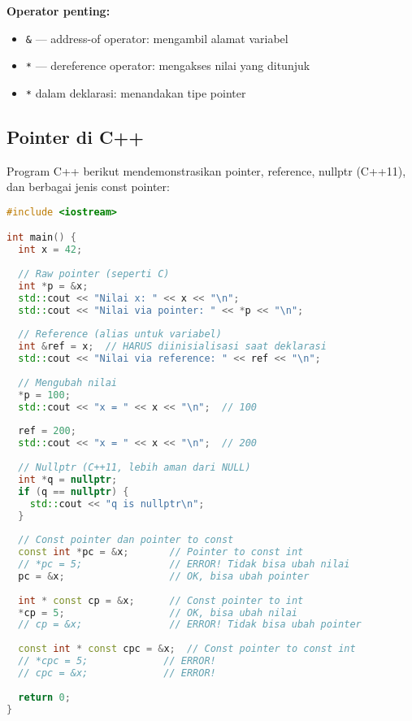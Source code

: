 \documentclass[../main.tex]{subfiles}
\begin{document}
\textbf{Operator penting:}
\begin{itemize}
  \item \texttt{\&} --- address-of operator: mengambil alamat variabel
  \item \texttt{*} --- dereference operator: mengakses nilai yang ditunjuk
  \item \texttt{*} dalam deklarasi: menandakan tipe pointer
\end{itemize}

\subsection{Pointer di C++}

Program C++ berikut mendemonstrasikan pointer, reference, nullptr (C++11), dan berbagai jenis const pointer:

\begin{lstlisting}[language=C++, caption={Pointer dan reference di C++}]
#include <iostream>

int main() {
  int x = 42;
  
  // Raw pointer (seperti C)
  int *p = &x;
  std::cout << "Nilai x: " << x << "\n";
  std::cout << "Nilai via pointer: " << *p << "\n";
  
  // Reference (alias untuk variabel)
  int &ref = x;  // HARUS diinisialisasi saat deklarasi
  std::cout << "Nilai via reference: " << ref << "\n";
  
  // Mengubah nilai
  *p = 100;
  std::cout << "x = " << x << "\n";  // 100
  
  ref = 200;
  std::cout << "x = " << x << "\n";  // 200
  
  // Nullptr (C++11, lebih aman dari NULL)
  int *q = nullptr;
  if (q == nullptr) {
    std::cout << "q is nullptr\n";
  }
  
  // Const pointer dan pointer to const
  const int *pc = &x;       // Pointer to const int
  // *pc = 5;               // ERROR! Tidak bisa ubah nilai
  pc = &x;                  // OK, bisa ubah pointer
  
  int * const cp = &x;      // Const pointer to int
  *cp = 5;                  // OK, bisa ubah nilai
  // cp = &x;               // ERROR! Tidak bisa ubah pointer
  
  const int * const cpc = &x;  // Const pointer to const int
  // *cpc = 5;             // ERROR!
  // cpc = &x;             // ERROR!
  
  return 0;
}
\end{lstlisting}
\end{document}
